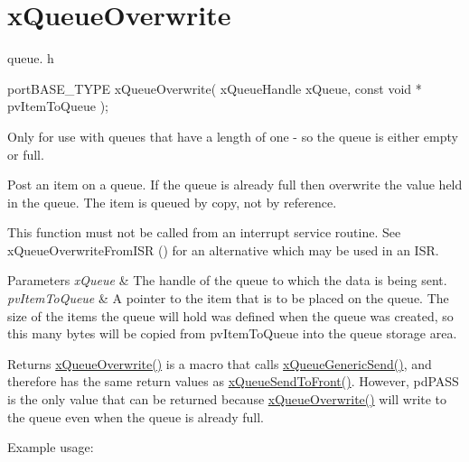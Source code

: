 \hypertarget{group__x_queue_overwrite}{}\section{x\+Queue\+Overwrite}
\label{group__x_queue_overwrite}
queue. h 
\begin{DoxyPre}
 portBASE\_TYPE xQueueOverwrite(
                              xQueueHandle xQueue,
                              const void * pvItemToQueue
                         );
   \end{DoxyPre}


Only for use with queues that have a length of one -\/ so the queue is either empty or full.

Post an item on a queue. If the queue is already full then overwrite the value held in the queue. The item is queued by copy, not by reference.

This function must not be called from an interrupt service routine. See x\+Queue\+Overwrite\+From\+I\+SR () for an alternative which may be used in an I\+SR.


\begin{DoxyParams}{Parameters}
{\em x\+Queue} & The handle of the queue to which the data is being sent.\\
\hline
{\em pv\+Item\+To\+Queue} & A pointer to the item that is to be placed on the queue. The size of the items the queue will hold was defined when the queue was created, so this many bytes will be copied from pv\+Item\+To\+Queue into the queue storage area.\\
\hline
\end{DoxyParams}
\begin{DoxyReturn}{Returns}
\mbox{\hyperlink{queue_8h_a8e9ced123b5a0e37a36d3bbdb2e56b4e}{x\+Queue\+Overwrite()}} is a macro that calls \mbox{\hyperlink{queue_8h_a1ff8f61508bc9c0fa0abc44750fc1981}{x\+Queue\+Generic\+Send()}}, and therefore has the same return values as \mbox{\hyperlink{queue_8h_aa612fcc2b1ceee0200f34b942e300b41}{x\+Queue\+Send\+To\+Front()}}. However, pd\+P\+A\+SS is the only value that can be returned because \mbox{\hyperlink{queue_8h_a8e9ced123b5a0e37a36d3bbdb2e56b4e}{x\+Queue\+Overwrite()}} will write to the queue even when the queue is already full.
\end{DoxyReturn}
Example usage\+: 
\begin{DoxyPre}\end{DoxyPre}



